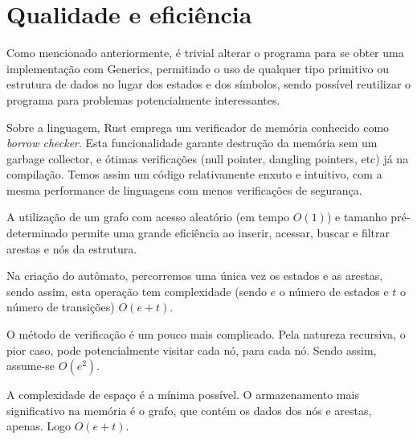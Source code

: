 \documentclass[12pt]{article}
\begin{document}
\section{Qualidade e eficiência}
Como mencionado anteriormente, é trivial alterar o programa para se obter uma implementação com Generics, permitindo o uso de qualquer tipo primitivo ou estrutura de dados no lugar dos estados e dos símbolos, sendo possível reutilizar o programa para  problemas potencialmente interessantes.

Sobre a linguagem, Rust emprega um verificador de memória conhecido como \textit{borrow checker}. Esta funcionalidade garante destrução da memória sem um garbage collector, e ótimas verificações (null pointer, dangling pointers, etc) já na compilação. Temos assim um código relativamente enxuto e intuitivo, com a mesma performance de linguagens com menos verificações de segurança.

A utilização de um grafo com acesso aleatório (em tempo \(O(1)\)) e tamanho pré-determinado permite uma grande eficiência ao inserir, acessar, buscar e filtrar arestas e nós da estrutura.

Na criação do autômato, percorremos uma única vez os estados e as arestas, sendo assim, esta operação tem complexidade (sendo \(e\) o número de estados e \(t\) o número de transições) \(O(e+t)\).

O método de verificação é um pouco mais complicado. Pela natureza recursiva, o pior caso, pode potencialmente visitar cada nó, para cada nó. Sendo assim, assume-se \(O(e^2)\).

A complexidade de espaço é a mínima possível. O armazenamento mais significativo na memória é o grafo, que contém os dados dos nós e arestas, apenas. Logo \(O(e+t)\).
\end{document}
